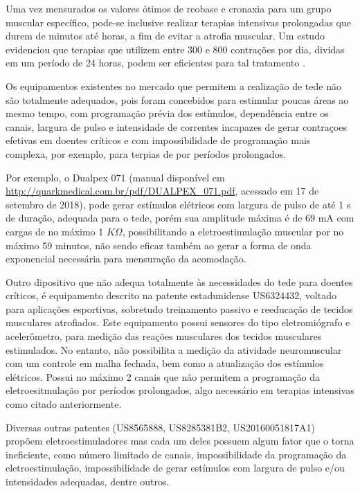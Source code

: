 Uma vez mensurados os valores ótimos de reobase e cronaxia para um grupo muscular específico, pode-se inclusive realizar terapias intensivas prolongadas que durem de minutos até horas, a fim de evitar a atrofia muscular. Um estudo evidenciou que terapias que utilizem entre 300 e 800 contrações por dia, dividas em um período de 24 horas, podem ser eficientes para tal tratamento \cite{dow}.

Os equipamentos existentes no mercado que permitem a realização de \ac{tede} não são totalmente adequados, pois foram concebidos para estimular poucas áreas ao mesmo tempo, com programação prévia dos estímulos, dependência entre os canais, largura de pulso e intensidade de correntes incapazes de gerar contraçoes efetivas em doentes críticos e com impossibilidade de programação mais complexa, por exemplo, para terpias de por períodos prolongados. 

Por exemplo, o Dualpex 071 (manual disponível em \url{http://quarkmedical.com.br/pdf/DUALPEX_071.pdf}, acessado em 17 de setembro de 2018), pode gerar estímulos elétricos com largura de pulso de até 1 s de duração, adequada para o \ac{tede}, porém sua amplitude máxima é de 69 mA com cargas de no máximo 1 $K\Omega$, possibilitando a eletroestimulação muscular por no máximo 59 minutos, não sendo eficaz também ao gerar a forma de onda exponencial necessária para mensuração da acomodação.

Outro dipositivo que não adequa totalmente às necessidades do \ac{tede} para doentes críticos, é equipamento descrito na patente estadunidense US6324432, voltado para aplicações esportivas, sobretudo treinamento passivo e reeducação de tecidos musculares atrofiados. Este equipamento possui sensores do tipo eletromiógrafo e acelerômetro, para medição das reações musculares dos tecidos musculares estimulados. No entanto, não possibilita a medição da atividade neuromuscular com um controle em malha fechada, bem como a atualização dos estímulos elétricos. Possui no máximo 2 canais que não permitem a programação da eletroesitmulação por períodos prolongados, algo necessário em terapias intensivas como citado anteriormente.

Diversas outras patentes (US8565888, US8285381B2, US20160051817A1) propõem eletroestimuladores mas cada um deles possuem algum fator que o torna ineficiente, como número limitado de canais, impossibilidade da programação da eletroestimulação, impossibilidade de gerar estímulos com largura de pulso e/ou intensidades adequadas, dentre outros.


